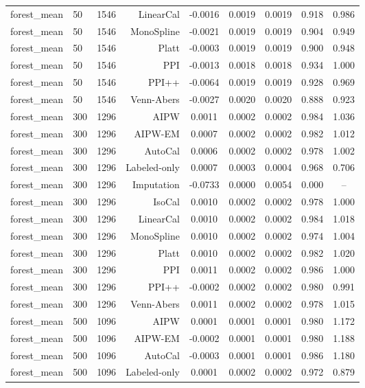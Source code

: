 \begin{tabular}{lllrccccc}
forest\_mean & 50 & 1546 & LinearCal & -0.0016 & 0.0019 & 0.0019 & 0.918 & 0.986 \\
forest\_mean & 50 & 1546 & MonoSpline & -0.0021 & 0.0019 & 0.0019 & 0.904 & 0.949 \\
forest\_mean & 50 & 1546 & Platt & -0.0003 & 0.0019 & 0.0019 & 0.900 & 0.948 \\
forest\_mean & 50 & 1546 & PPI & -0.0013 & 0.0018 & 0.0018 & 0.934 & 1.000 \\
forest\_mean & 50 & 1546 & PPI++ & -0.0064 & 0.0019 & 0.0019 & 0.928 & 0.969 \\
forest\_mean & 50 & 1546 & Venn-Abers & -0.0027 & 0.0020 & 0.0020 & 0.888 & 0.923 \\
forest\_mean & 300 & 1296 & AIPW & 0.0011 & 0.0002 & 0.0002 & 0.984 & 1.036 \\
forest\_mean & 300 & 1296 & AIPW-EM & 0.0007 & 0.0002 & 0.0002 & 0.982 & 1.012 \\
forest\_mean & 300 & 1296 & AutoCal & 0.0006 & 0.0002 & 0.0002 & 0.978 & 1.002 \\
forest\_mean & 300 & 1296 & Labeled-only & 0.0007 & 0.0003 & 0.0004 & 0.968 & 0.706 \\
forest\_mean & 300 & 1296 & Imputation & -0.0733 & 0.0000 & 0.0054 & 0.000 & -- \\
forest\_mean & 300 & 1296 & IsoCal & 0.0010 & 0.0002 & 0.0002 & 0.978 & 1.000 \\
forest\_mean & 300 & 1296 & LinearCal & 0.0010 & 0.0002 & 0.0002 & 0.984 & 1.018 \\
forest\_mean & 300 & 1296 & MonoSpline & 0.0010 & 0.0002 & 0.0002 & 0.974 & 1.004 \\
forest\_mean & 300 & 1296 & Platt & 0.0010 & 0.0002 & 0.0002 & 0.982 & 1.020 \\
forest\_mean & 300 & 1296 & PPI & 0.0011 & 0.0002 & 0.0002 & 0.986 & 1.000 \\
forest\_mean & 300 & 1296 & PPI++ & -0.0002 & 0.0002 & 0.0002 & 0.980 & 0.991 \\
forest\_mean & 300 & 1296 & Venn-Abers & 0.0011 & 0.0002 & 0.0002 & 0.978 & 1.015 \\
forest\_mean & 500 & 1096 & AIPW & 0.0001 & 0.0001 & 0.0001 & 0.980 & 1.172 \\
forest\_mean & 500 & 1096 & AIPW-EM & -0.0002 & 0.0001 & 0.0001 & 0.980 & 1.188 \\
forest\_mean & 500 & 1096 & AutoCal & -0.0003 & 0.0001 & 0.0001 & 0.986 & 1.180 \\
forest\_mean & 500 & 1096 & Labeled-only & 0.0001 & 0.0002 & 0.0002 & 0.972 & 0.879 \\

\end{tabular}

